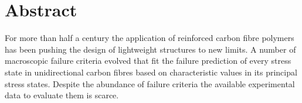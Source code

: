 \chapter*{Abstract}

For more than half a century the application of reinforced carbon fibre polymers has been pushing the design of lightweight structures to new limits. A number of macroscopic failure criteria evolved that fit the failure prediction of every stress state in unidirectional carbon fibres based on characteristic values in its principal stress states. Despite the abundance of failure criteria the available experimental data to evaluate them is scarce.
